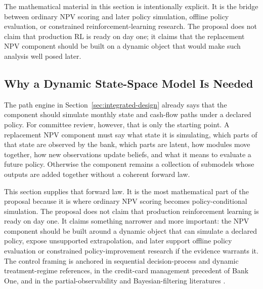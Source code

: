 \documentclass[11pt]{article}
\newcommand{\1}{\mathbf{1}}
\begin{document}
The mathematical material in this section is intentionally explicit.  It is the
bridge between ordinary NPV scoring and later policy simulation, offline policy
evaluation, or constrained reinforcement-learning research.  The proposal does
not claim that production RL is ready on day one; it claims that the replacement
NPV component should be built on a dynamic object that would make such analysis
well posed later.

\subsection{Why a Dynamic State-Space Model Is Needed}
\label{sec:state-space-assembly}

The path engine in Section~\ref{sec:integrated-design} already says that the
component should simulate monthly state and cash-flow paths under a declared
policy. For committee review, however, that is only the starting point. A
replacement NPV component must say what state it is simulating, which parts of
that state are observed by the bank, which parts are latent, how modules move
together, how new observations update beliefs, and what it means to evaluate a
future policy. Otherwise the component remains a collection of submodels whose
outputs are added together without a coherent forward law.

This section supplies that forward law. It is the most mathematical part of the
proposal because it is where ordinary NPV scoring becomes policy-conditional
simulation. The proposal does not claim that production reinforcement learning
is ready on day one. It claims something narrower and more important: the NPV
component should be built around a dynamic object that can simulate a declared
policy, expose unsupported extrapolation, and later support offline policy
evaluation or constrained policy-improvement research if the evidence warrants
it. The control framing is anchored in sequential decision-process and dynamic
treatment-regime references, in the credit-card management precedent of Bank
One, and in the partial-observability and Bayesian-filtering literatures
\citep{puterman1994mdp,murphy2003dynamic,trench2003bankone,
thomas2011creditcardmdp,smallwood1973pomdp,kaelbling1998pomdp,durbinkoopman2012ssm,
westharrison1997bfdm,doucet2001smc}.
\end{document}
